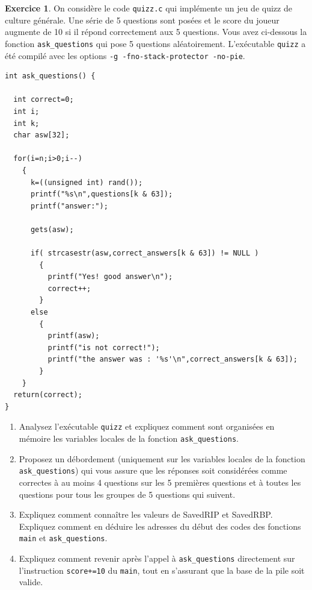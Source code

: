 \documentclass[a4paper,9pt]{article}
\newenvironment{terminal}{\color{black}\begin{snugshade*}}
{\end{snugshade*}\color{black}}
\theoremstyle{plain}
\theoremstyle{definition}
\newtheorem{exercice}{Exercice}
\begin{document}
\begin{exercice}
On considère le code \texttt{quizz.c} qui implémente un jeu de quizz de culture générale. Une série de 5 questions sont posées et le score du joueur augmente de 10 si il répond correctement aux 5 questions. Vous avez ci-dessous la fonction \verb|ask_questions| qui pose 5 questions aléatoirement. L'exécutable \verb|quizz| a été compilé avec les options \verb|-g -fno-stack-protector -no-pie|.


\begin{terminal}
\begin{verbatim}
int ask_questions() {

  int correct=0;
  int i;
  int k;
  char asw[32];
  
  for(i=n;i>0;i--)
    {  
      k=((unsigned int) rand());
      printf("%s\n",questions[k & 63]);
      printf("answer:");
      
      gets(asw);
      
      if( strcasestr(asw,correct_answers[k & 63]) != NULL )
        {
          printf("Yes! good answer\n");          
          correct++;
        }
      else
        {
          printf(asw);
          printf("is not correct!");
          printf("the answer was : '%s'\n",correct_answers[k & 63]);          
        }
    }
  return(correct);
}
\end{verbatim}
\end{terminal}
\begin{enumerate}
\item Analysez l'exécutable \verb|quizz| et expliquez comment sont organisées en mémoire les variables locales de la fonction \verb|ask_questions|. 
\item  Proposez un débordement (uniquement sur les variables locales de la fonction \verb|ask_questions|) qui vous assure que les  réponses soit considérées comme correctes à au moins 4 questions sur les 5 premières questions et à toutes les questions pour tous les groupes de 5 questions qui suivent.
\item Expliquez comment connaître les valeurs de SavedRIP et SavedRBP. Expliquez comment en déduire les adresses du début des codes des fonctions \verb|main| et \verb|ask_questions|. 

\item Expliquez  comment revenir après l'appel à \verb|ask_questions| directement sur l'instruction \verb|score+=10| du \verb|main|, tout en s'assurant que la base de la pile soit valide. 
\end{enumerate}
\end{exercice}
\end{document}
